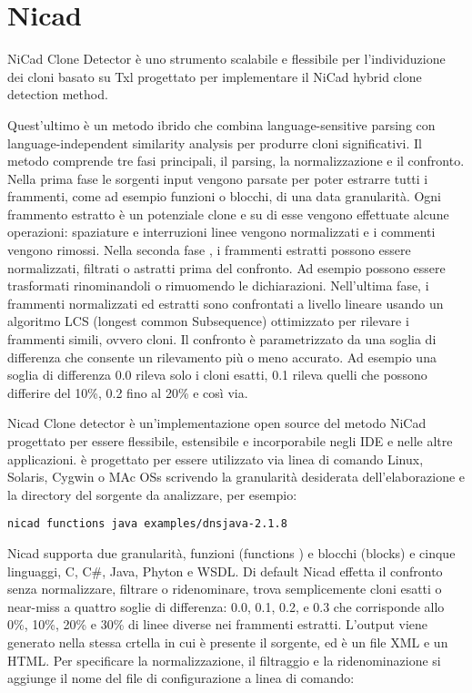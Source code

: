 \section{Nicad}
NiCad Clone Detector è uno strumento scalabile e flessibile per l'individuzione dei cloni basato su Txl progettato per implementare il NiCad hybrid clone detection method.

Quest'ultimo è un metodo ibrido che combina language-sensitive parsing con language-independent similarity analysis per produrre cloni significativi.
Il metodo comprende tre fasi principali, il parsing, la normalizzazione e il confronto.
Nella prima fase le sorgenti input vengono parsate per poter estrarre tutti i frammenti, come ad esempio funzioni o blocchi, di una data granularità. Ogni frammento estratto è un potenziale clone e su di esse vengono effettuate alcune operazioni: spaziature e interruzioni linee vengono normalizzati e i commenti vengono rimossi. 
Nella seconda fase , i frammenti estratti possono essere normalizzati, filtrati o astratti prima del confronto. Ad esempio possono essere trasformati rinominandoli o rimuomendo le dichiarazioni.
Nell'ultima fase, i frammenti normalizzati ed estratti sono confrontati a livello lineare usando un algoritmo LCS (longest common Subsequence) ottimizzato per rilevare i frammenti simili, ovvero cloni. Il confronto è parametrizzato da una soglia di differenza che consente un rilevamento più o meno accurato. Ad esempio una soglia di differenza 0.0 rileva solo i cloni esatti, 0.1 rileva quelli che possono differire del 10\%, 0.2 fino al 20\% e così via.

Nicad Clone detector è un'implementazione open source del metodo NiCad progettato per essere flessibile, estensibile e incorporabile negli IDE e nelle altre applicazioni. è progettato per essere utilizzato via linea di comando Linux, Solaris, Cygwin o MAc OSs scrivendo la granularità desiderata dell'elaborazione e la directory del sorgente da analizzare, per esempio: 

\begin{center}
\verb|nicad functions java examples/dnsjava-2.1.8|
\end{center}

Nicad supporta due granularità, funzioni (functions ) e blocchi (blocks) e cinque linguaggi, C, C\#, Java, Phyton e WSDL.
Di default Nicad effetta il confronto senza normalizzare, filtrare o ridenominare, trova semplicemente cloni esatti o near-miss a quattro soglie di differenza: 0.0, 0.1, 0.2, e 0.3 che corrisponde allo 0\%, 10\%, 20\% e 30\% di linee diverse nei frammenti estratti.
L'output viene generato nella stessa crtella in cui è presente il sorgente, ed è un file XML e un HTML.
Per specificare la normalizzazione, il filtraggio e la ridenominazione si aggiunge il nome del file di configurazione a linea di comando:

